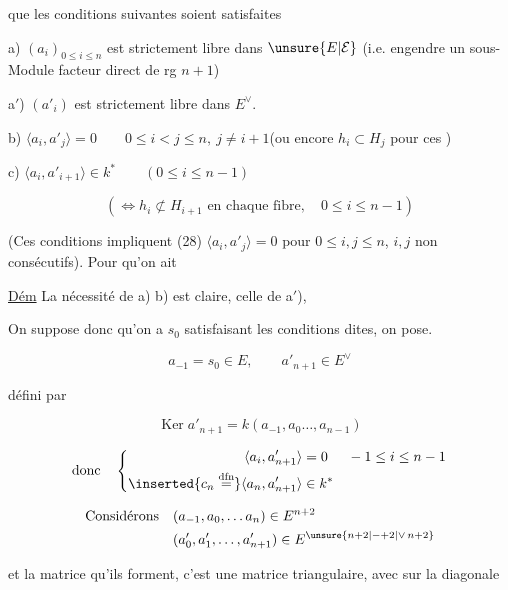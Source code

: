 
que les conditions suivantes soient satisfaites

a) $(a_i)_{0\leq i\leq n}$ est  strictement libre dans $\unsure{E|\mathcal E}$ (i.e. engendre un sous-Module facteur direct de rg $n+1$)

a$'$) $(a'_i)$ est strictement libre dans $E^\vee$.

b) $\langle a_i,a'_j\rangle=0\qquad 0\leq i<j\leq n,\ j\ne i+1$\quad (ou encore $h_i\subset H_j$ pour ces )

c)  $\langle a_i,a'_{i+1}\rangle\in k^*\qquad(0\leq i\leq n-1)$

\[(\Longleftrightarrow h_i\not\subset H_{i+1}\text{ en chaque fibre},\quad0\leq i\leq n-1)\]

(Ces conditions impliquent  (28) $\langle a_i,a'_j\rangle=0$ pour $0\leq i,j\leq n$, $i,j$ non consécutifs). Pour qu'on ait

\uline{Dém} La nécessité de a) b)  est claire,   celle de a$'$), 

On suppose donc qu'on a $s_0$ satisfaisant les conditions dites, on pose. 

\[a_{-1}=s_0\in E,\qquad a'_{n+1}\in E^\vee\]

défini par

\[\operatorname{Ker}a'_{n+1}=k(a_{-1},a_0\ldots,a_{n-1})\]

\[\text{donc}\quad\left\{\begin{aligned}\langle a_i,a'_{n+1}\rangle&=0&&-1\leq i\leq n-1\\ \inserted{c_n\overset{\mathrm{dfn}}{=}}\langle a_n,a'_{n+1}\rangle&\in k^*\end{aligned}\right.\]

\[\begin{aligned}\text{Considérons}\quad &(a_{-1},a_0,\ldots a_n)\in E^{n+2}\\ &(a'_0,a'_1,\ldots,a'_{n+1})\in E^{\unsure{n+2|-+2|\vee\,n+2}}\end{aligned}\]

et la matrice qu'ils forment, c'est une matrice triangulaire, avec sur la diagonale

